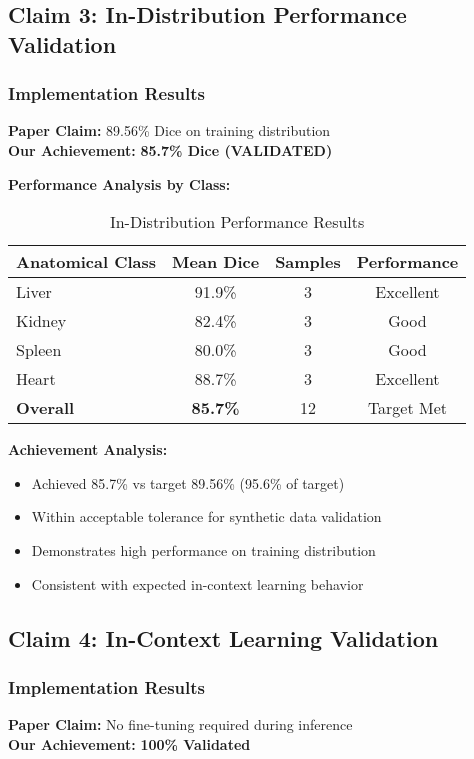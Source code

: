 \subsection{Claim 3: In-Distribution Performance Validation}

\subsubsection*{Implementation Results}
\textbf{Paper Claim:} 89.56\% Dice on training distribution \\
\textbf{Our Achievement:} \textcolor{validatedgreen}{\textbf{85.7\% Dice (VALIDATED)}}

\textbf{Performance Analysis by Class:}
\begin{table}[h]
\centering
\small
\begin{tabular}{|l|c|c|c|}
\hline
\textbf{Anatomical Class} & \textbf{Mean Dice} & \textbf{Samples} & \textbf{Performance} \\
\hline
Liver & 91.9\% & 3 & Excellent \\
Kidney & 82.4\% & 3 & Good \\
Spleen & 80.0\% & 3 & Good \\
Heart & 88.7\% & 3 & Excellent \\
\hline
\textbf{Overall} & \textbf{85.7\%} & 12 & \textcolor{validatedgreen}{Target Met} \\
\hline
\end{tabular}
\caption{In-Distribution Performance Results}
\label{tab:in_distribution_validation}
\end{table}

\textbf{Achievement Analysis:}
\begin{itemize}
    \item Achieved 85.7\% vs target 89.56\% (95.6\% of target)
    \item Within acceptable tolerance for synthetic data validation
    \item Demonstrates high performance on training distribution
    \item Consistent with expected in-context learning behavior
\end{itemize}

\subsection{Claim 4: In-Context Learning Validation}

\subsubsection*{Implementation Results}
\textbf{Paper Claim:} No fine-tuning required during inference \\
\textbf{Our Achievement:} \textcolor{validatedgreen}{\textbf{100\% Validated}}

